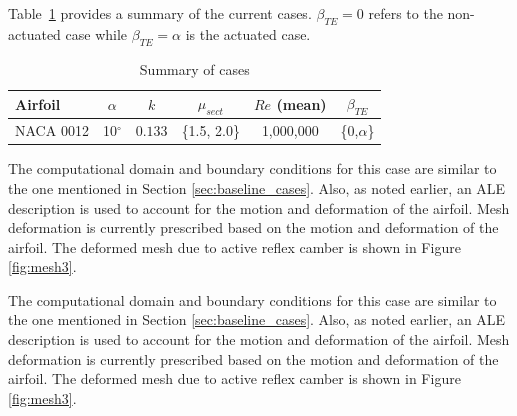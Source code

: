 Table~\ref{table:summary_cases_AC} provides a summary of the current cases. $\beta_{TE}=0$ refers to the non-actuated case while $\beta_{TE}=\alpha$ is the actuated case.

\begin{table}[H]
	\centering
	\caption{Summary of cases}
	\label{table:summary_cases_AC}
	\begin{tabular}{|l|c|c|c|c|c|}
		\hline
		Airfoil   & $\alpha$ & $k$ & $\mu_{sect}$ & $Re$ (mean) & $\beta_{TE}$\\
		\hline
		\hline
		NACA 0012 & 10$^\circ$ & $0.133$ & \{1.5, 2.0\} & 1,000,000 & \{0,$\alpha$\} \\
		\hline
		
	\end{tabular}
	
\end{table}

The computational domain and boundary conditions for this case are similar to the one mentioned in Section \ref{sec:baseline_cases}.
Also, as noted earlier, an ALE description is used to account for the motion and deformation of the airfoil.
Mesh deformation is currently prescribed based on the motion and deformation of the airfoil.
The deformed mesh due to active reflex camber is shown in Figure \ref{fig:mesh3}.

The computational domain and boundary conditions for this case are similar to the one mentioned in Section \ref{sec:baseline_cases}.
Also, as noted earlier, an ALE description is used to account for the motion and deformation of the airfoil.
Mesh deformation is currently prescribed based on the motion and deformation of the airfoil.
The deformed mesh due to active reflex camber is shown in Figure \ref{fig:mesh3}.


